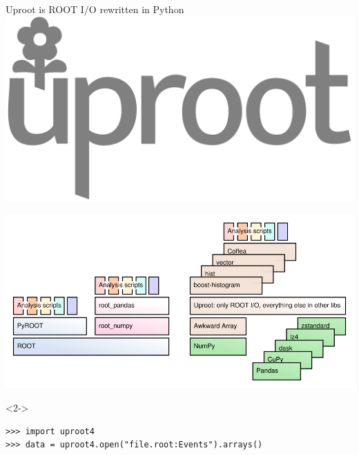 \documentclass[aspectratio=169]{beamer}
\begin{document}
\begin{frame}[fragile]{Uproot is ROOT I/O rewritten in Python}
\vspace{0.5 cm}
\includegraphics[height=1.5 cm]{uproot-logo.pdf}

\vspace{-1.75 cm}
\includegraphics[width=\linewidth]{abstraction-layers.png}

\small
\vspace{-0.7 cm}
\begin{uncoverenv}<2->
\begin{verbatim}
>>> import uproot4
>>> data = uproot4.open("file.root:Events").arrays()
\end{verbatim}
\end{uncoverenv}
\end{frame}
\end{document}

